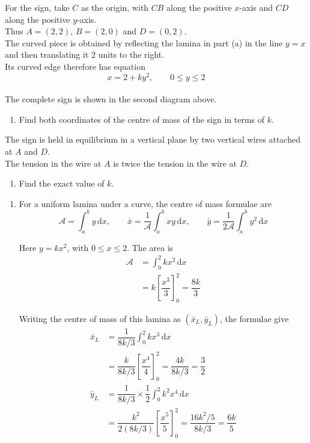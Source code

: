 \documentclass[leqno]{article}
\begin{document}
\begin{enumerate}[
  label=\textbf{\arabic*.},
  leftmargin=*,
  topsep=0pt,
  partopsep=0pt,
  parsep=0pt
]
For the sign, take $C$ as the origin, with $CB$ along the positive $x$-axis and $CD$ along the positive $y$-axis. \\
Thus $A=(2,2)$, $B=(2,0)$ and $D=(0,2)$. \\
The curved piece is obtained by reflecting the lamina in part (a) in the line $y=x$ and then translating it $2$ units to the right. \\
Its curved edge therefore has equation
\[
x=2+ky^2,\qquad 0\leq y\leq2
\] \\
The complete sign is shown in the second diagram above. \\
\begin{enumerate}[label=\textbf{(\alph*)}, resume]
\item Find both coordinates of the centre of mass of the sign in terms of $k$.  \\
\end{enumerate}
The sign is held in equilibrium in a vertical plane by two vertical wires attached at $A$ and $D$. \\
The tension in the wire at $A$ is twice the tension in the wire at $D$. \\
\begin{enumerate}[label=\textbf{(\alph*)}, resume]
\item Find the exact value of $k$.  \\
\end{enumerate}

\vspace*{10pt}

\begin{djsSolution}
\begin{enumerate}[label=\textbf{(\alph*)}, start=1]
\item
For a uniform lamina under a curve, the centre of mass formulae are
\[
\mathcal{A}=\int_a^b y\,\mathrm{d}x,
\qquad
\bar{x}=\frac{1}{\mathcal{A}}\int_a^b xy\,\mathrm{d}x,
\qquad
\bar{y}=\frac{1}{2\mathcal{A}}\int_a^b y^2\,\mathrm{d}x
\]

Here \(y=kx^2\), with \(0\leq x\leq2\). The area is
\begin{align*}
\mathcal A
&=\int_0^2 kx^2\,\mathrm{d}x\\
&=k\left[\dfrac{x^3}{3}\right]_0^2
=\dfrac{8k}{3}
\end{align*}

Writing the centre of mass of this lamina as \((\bar{x}_L,\bar{y}_L)\), the formulae give
\begin{align*}
\bar{x}_L
&=\dfrac{1}{8k/3}\int_0^2 kx^3\,\mathrm{d}x\\
&=\dfrac{k}{8k/3}\left[\dfrac{x^4}{4}\right]_0^2
=\dfrac{4k}{8k/3}
=\dfrac32\\
\bar{y}_L
&=\dfrac{1}{8k/3}\times\dfrac12\int_0^2 k^2x^4\,\mathrm{d}x\\
&=\dfrac{k^2}{2(8k/3)}\left[\dfrac{x^5}{5}\right]_0^2
=\dfrac{16k^2/5}{8k/3}
=\dfrac{6k}{5}
\end{align*}


\end{enumerate}
\end{djsSolution}
\end{enumerate}
\end{document}
